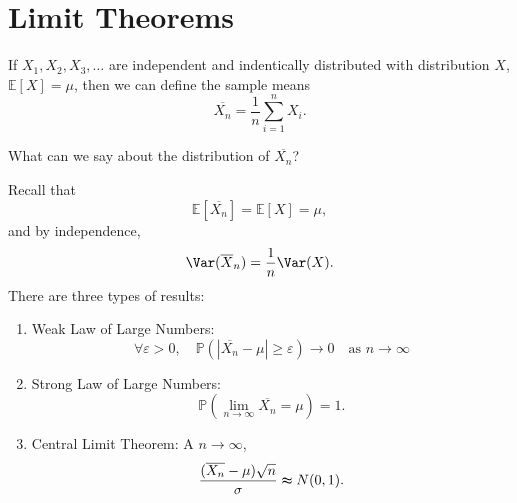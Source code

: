 \chapter{Limit Theorems}
If \(X_1, X_2, X_3, \dots \) are independent and indentically distributed with distribution \(X\), \(\mathbb{E} [X] = \mu\), then we can define the sample means 
\[
    \overline{X_n} = \frac{1}{n} \sum_{i=1}^n X_i.  
\]   
\begin{question}
    What can we say about the distribution of \(\overline{X_n} \)? 
\end{question}

Recall that 
\[
    \mathbb{E} \left[ \overline{X_n}  \right] = \mathbb{E} [X] = \mu, 
\]
and by independence,
\[
    \Var(\overline{X} _n) = \frac{1}{n} \Var(X).
\]
There are three types of results:
\begin{enumerate}[(1)]
    \item Weak Law of Large Numbers:
    \[
        \forall \varepsilon > 0, \quad \mathbb{P} \left( \left\vert \overline{X_n} - \mu   \right\vert \ge \varepsilon \right) \to 0 \quad \text{as } n \to \infty   
    \]
    \item Strong Law of Large Numbers:
    \[
        \mathbb{P} \left( \lim_{n \to \infty} \overline{X_n} = \mu   \right) = 1. 
    \]
    \item Central Limit Theorem: A \(n \to \infty\), 
    \[
        \frac{(\overline{X_n} - \mu) \sqrt{n} }{\sigma } \thickapprox N(0, 1).  
    \]
\end{enumerate}